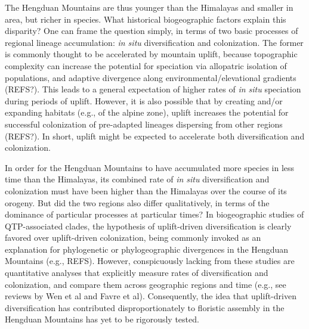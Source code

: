 The Hengduan Mountains are thus younger than the Himalayas and smaller in area, but richer in species. What historical biogeographic factors explain this disparity? One can frame the question simply, in terms of two basic processes of regional lineage accumulation: \textit{in situ} diversification and colonization. The former is commonly thought to be accelerated by mountain uplift, because topographic complexity can increase the potential for speciation via allopatric isolation of populations, and adaptive divergence along environmental/elevational gradients (REFS?). This leads to a general expectation of higher rates of \textit{in situ} speciation during periods of uplift. However, it is also possible that by creating and/or expanding habitats (e.g., of the alpine zone), uplift increases the potential for successful colonization of pre-adapted lineages dispersing from other regions (REFS?). In short, uplift might be expected to accelerate both diversification and colonization.

In order for the Hengduan Mountains to have accumulated more species in less time than the Himalayas, its combined rate of \textit{in situ} diversification and colonization must have been higher than the Himalayas over the course of its orogeny. But did the two regions also differ qualitatively, in terms of the dominance of particular processes at particular times? In biogeographic studies of QTP-associated clades, the hypothesis of uplift-driven diversification is clearly favored over uplift-driven colonization, being commonly invoked as an explanation for phylogenetic or phylogeographic divergences in the Hengduan Mountains (e.g., REFS). However, conspicuously lacking from these studies are quantitative analyses that explicitly measure rates of diversification and colonization, and compare them across geographic regions and time (e.g., see reviews by Wen et al and Favre et al). Consequently, the idea that uplift-driven diversification has contributed disproportionately to floristic assembly in the Hengduan Mountains has yet to be rigorously tested.



